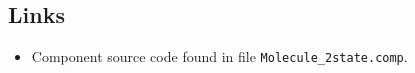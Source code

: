 \subsection*{Links}
\begin{itemize}
  \item Component source code found in file \texttt{Molecule\_2state.comp}.
\end{itemize}
